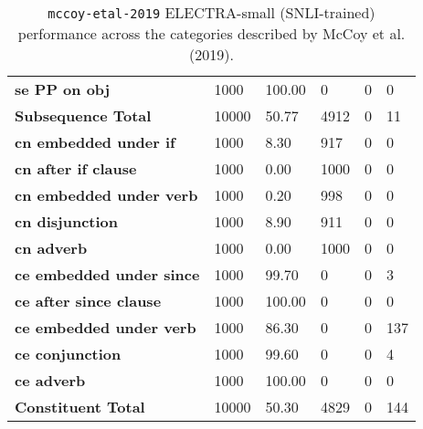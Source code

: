\documentclass[11pt,a4paper]{article}
\begin{document}
\begin{table}[!hbt]
\begin{tabular}{p{}|p{} p{} p{} p{} p{} }
        \textbf{se PP on obj} & 1000 & 100.00 & 0 & 0 & 0 \\
        \textbf{Subsequence Total} & 10000 & 50.77 & 4912 & 0 & 11 \\
        \hline
        \textbf{cn embedded under if} & 1000 & 8.30 & 917 & 0 & 0 \\
        \textbf{cn after if clause} & 1000 & 0.00 & 1000 & 0 & 0 \\
        \textbf{cn embedded under verb} & 1000 & 0.20 & 998 & 0 & 0 \\
        \textbf{cn disjunction} & 1000 & 8.90 & 911 & 0 & 0 \\
        \textbf{cn adverb} & 1000 & 0.00 & 1000 & 0 & 0 \\
        \textbf{ce embedded under since} & 1000 & 99.70 & 0 & 0 & 3 \\
        \textbf{ce after since clause} & 1000 & 100.00 & 0 & 0 & 0 \\
        \textbf{ce embedded under verb} & 1000 & 86.30 & 0 & 0 & 137 \\
        \textbf{ce conjunction} & 1000 & 99.60 & 0 & 0 & 4 \\
        \textbf{ce adverb} & 1000 & 100.00 & 0 & 0 & 0 \\
        \textbf{Constituent Total} & 10000 & 50.30 & 4829 & 0 & 144 \\
    \end{tabular}
    \caption{\texttt{mccoy-etal-2019} ELECTRA-small (SNLI-trained) performance across the categories described by McCoy et al. (2019).}
\end{table}
\end{document}

